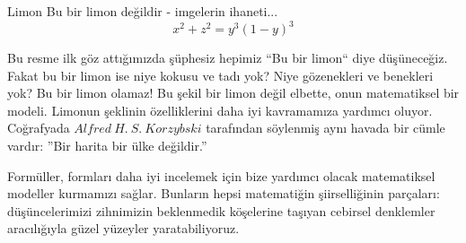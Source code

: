 \begin{surferPage}{Limon}
Bu bir limon değildir - imgelerin ihaneti...\\
\smallskip
\[x^2 + z^2 = y^3 (1 - y)^3\] 


\singlespacing
Bu resme ilk göz attığımızda şüphesiz hepimiz  ``Bu bir limon`` diye düşüneceğiz. Fakat bu bir limon ise niye kokusu ve tadı yok? Niye gözenekleri ve benekleri yok? Bu bir limon olamaz!
\singlespacing
Bu şekil bir limon değil elbette, onun matematiksel bir modeli. Limonun şeklinin özelliklerini daha iyi kavramamıza yardımcı oluyor. Coğrafyada  $Alfred\ H.\ S.\ Korzybski$ tarafından söylenmiş aynı havada bir cümle vardır: ''Bir harita bir ülke değildir.'' \\
\singlespacing

Formüller, formları daha iyi incelemek için bize yardımcı olacak matematiksel modeller kurmamızı sağlar.
\singlespacing
Bunların hepsi matematiğin şiirselliğinin parçaları:   düşüncelerimizi zihnimizin beklenmedik köşelerine taşıyan cebirsel denklemler aracılığıyla güzel yüzeyler yaratabiliyoruz.
\end{surferPage}
